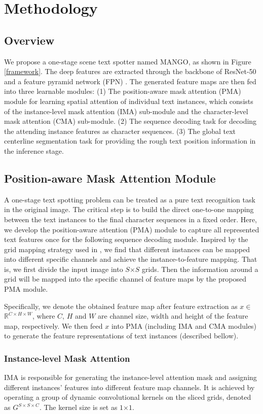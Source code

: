 \documentclass[letterpaper]{article} \usepackage{aaai21}  \usepackage{times}  \usepackage{helvet} \usepackage{courier}  \usepackage[hyphens]{url}  \usepackage{graphicx} \urlstyle{rm} \def\UrlFont{\rm}  \usepackage{natbib}  \usepackage{caption} \frenchspacing  \setlength{\pdfpagewidth}{8.5in}  \setlength{\pdfpageheight}{11in}  \usepackage{multirow}
\begin{document}
\section{Methodology}
\subsection{Overview}
We propose a one-stage scene text spotter named MANGO, as shown in Figure \ref{framework}.
The deep features are extracted through the backbone of ResNet-50 \cite{he2016deep} and a feature pyramid network (FPN) \cite{lin2017feature}.
The generated feature maps are then fed into three learnable modules:
(1) The position-aware mask attention (PMA) module for learning spatial attention of individual text instances, which consists of the instance-level mask attention (IMA) sub-module and the character-level mask attention (CMA) sub-module.
(2) The sequence decoding task for decoding the attending instance features as character sequences.
(3) The global text centerline segmentation task for providing the rough text position information in the inference stage.
\subsection{Position-aware Mask Attention Module}

A one-stage text spotting problem can be treated as a pure text recognition task in the original image. The critical step is to build the direct one-to-one mapping between the text instances to the final character sequences in a fixed order.
Here, we develop the position-aware attention (PMA) module to capture all represented text features once for the following sequence decoding module.
Inspired by the grid mapping strategy used in \cite{wang2019solo}, we find that different instances can be mapped into different specific channels and achieve the instance-to-feature mapping.
That is, we first divide the input image into $S$$\times$$S$ grids. Then the information around a grid will be mapped into the specific channel of feature maps by the proposed PMA module.

Specifically,
we denote the obtained feature map after feature extraction as $x$$\in$$\mathbb{R}^{C\times H\times W}$, where $C$, $H$ and $W$ are channel size, width and height of the feature map, respectively.
We then feed $x$ into PMA (including IMA and CMA modules) to generate the feature representations of text instances (described bellow).

\subsubsection{Instance-level Mask Attention}
IMA is responsible for generating the instance-level attention mask and assigning different instances' features into different feature map channels. It is achieved by operating a group of dynamic convolutional kernels \cite{wang2020solov2} on the sliced grids, denoted as $G^{S\times S\times C}$. The kernel size is set as $1$$\times$$1$.
\end{document}
